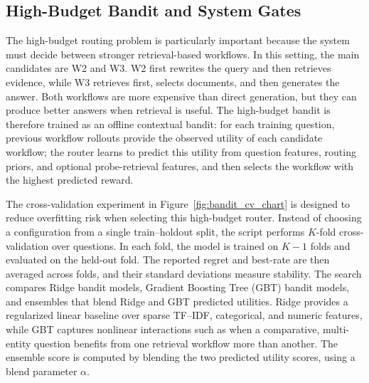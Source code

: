 \documentclass[12pt,a4paper]{article}
\begin{document}
\subsection{High-Budget Bandit and System Gates}

The high-budget routing problem is particularly important because the system must decide between stronger retrieval-based workflows. In this setting, the main candidates are W2 and W3. W2 first rewrites the query and then retrieves evidence, while W3 retrieves first, selects documents, and then generates the answer. Both workflows are more expensive than direct generation, but they can produce better answers when retrieval is useful. The high-budget bandit is therefore trained as an offline contextual bandit: for each training question, previous workflow rollouts provide the observed utility of each candidate workflow; the router learns to predict this utility from question features, routing priors, and optional probe-retrieval features, and then selects the workflow with the highest predicted reward.

The cross-validation experiment in Figure~\ref{fig:bandit_cv_chart} is designed to reduce overfitting risk when selecting this high-budget router. Instead of choosing a configuration from a single train--holdout split, the script performs $K$-fold cross-validation over questions. In each fold, the model is trained on $K-1$ folds and evaluated on the held-out fold. The reported regret and best-rate are then averaged across folds, and their standard deviations measure stability. The search compares Ridge bandit models, Gradient Boosting Tree (GBT) bandit models, and ensembles that blend Ridge and GBT predicted utilities. Ridge provides a regularized linear baseline over sparse TF--IDF, categorical, and numeric features, while GBT captures nonlinear interactions such as when a comparative, multi-entity question benefits from one retrieval workflow more than another. The ensemble score is computed by blending the two predicted utility scores, using a blend parameter $\alpha$.
\end{document}
